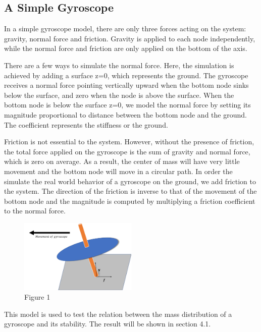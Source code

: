 \documentclass[12pt]{article}
\renewcommand{\(}{\left (}
\renewcommand{\)}{\right )}
\begin{document}
\subsection{A Simple Gyroscope}
\hspace{5mm} In a simple gyroscope model, there are only three forces acting on the system: gravity, normal force and friction.
Gravity is applied to each node independently, while the normal force and friction are only applied on the bottom of the axis.

There are a few ways to simulate the normal force. Here, the simulation is achieved by adding a surface z=0, which represents the ground. The gyroscope receives a normal force pointing vertically upward when the bottom node sinks below the surface, and zero when the node is above the surface. When the bottom node is below the surface z=0, we model the normal force by setting its magnitude proportional to distance between the bottom node and the ground. The coefficient represents the stiffness or the ground.

Friction is not essential to the system. However, without the presence of friction, the total force applied on the gyroscope is the sum of gravity and normal force, which is zero on average. As a result, the center of mass will have very little movement and the bottom node will move in a circular path. In order the simulate the real world behavior of a gyroscope on the ground, we add friction to the system. The direction of the friction is inverse to that of the movement of the bottom node and the magnitude is computed by multiplying a friction coefficient to the normal force.
\begin {figure}[ht]
	\centering
    \includegraphics[width=0.5\textwidth]{1st_model.png}
    \caption*{\small Figure 1}
\end {figure}

This model is used to test the relation between the mass distribution of a gyroscope and its stability. The result will be shown in section 4.1.
\end{document}
